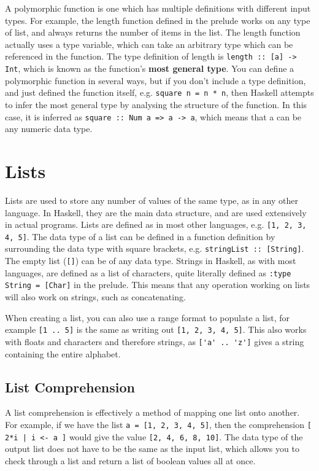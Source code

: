 A polymorphic function is one which has multiple definitions with different input types. For example, the length
 function defined in the prelude works on any type of list, and always returns the number of items in the list. The
 length function actually uses a type variable, which can take an arbitrary type which can be referenced in the function.
 The type definition of length is \verb`length :: [a] -> Int`, which is known as the function's \textbf{most general
 type}. You can define a polymorphic function in several ways, but if you don't include a type definition, and just
 defined the function itself, e.g. \verb`square n = n * n`, then Haskell attempts to infer the most general type by
 analysing the structure of the function. In this case, it is inferred as \verb`square :: Num a => a -> a`, which means
 that a can be any numeric data type.

\section*{Lists}

Lists are used to store any number of values of the same type, as in any other language. In Haskell, they are the main
 data structure, and are used extensively in actual programs. Lists are defined as in most other languages, e.g.
 \verb`[1, 2, 3, 4, 5]`. The data type of a list can be defined in a function definition by surrounding the data type
 with square brackets, e.g. \verb`stringList :: [String]`. The empty list (\verb`[]`) can be of any data type. Strings
 in Haskell, as with most languages, are defined as a list of characters, quite literally defined as
 \verb`:type String = [Char]` in the prelude. This means that any operation working on lists will also work on strings,
 such as concatenating.

When creating a list, you can also use a range format to populate a list, for example \verb`[1 .. 5]` is the same as
 writing out \verb`[1, 2, 3, 4, 5]`. This also works with floats and characters and therefore strings, as
 \verb`['a' .. 'z']` gives a string containing the entire alphabet.

\subsection*{List Comprehension}

A list comprehension is effectively a method of mapping one list onto another. For example, if we have the list
 \verb`a = [1, 2, 3, 4, 5]`, then the comprehension \verb`[ 2*i | i <- a ]` would give the value \verb`[2, 4, 6, 8, 10]`.
 The data type of the output list does not have to be the same as the input list, which allows you to check through a
 list and return a list of boolean values all at once.

